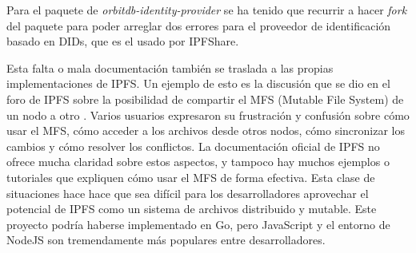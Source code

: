 Para el paquete de \textit{orbitdb-identity-provider} se ha tenido que recurrir a hacer \textit{fork} del paquete para poder arreglar
dos errores para el proveedor de identificación basado en DIDs, que es el usado por IPFShare.

Esta falta o mala documentación también se traslada a las propias implementaciones de IPFS. Un ejemplo de esto es la discusión que se dio en el foro de IPFS sobre la posibilidad de compartir el MFS (Mutable File System) de un nodo a otro \cite{ItPossibleShare}. Varios usuarios expresaron su frustración y confusión sobre cómo usar el MFS, cómo acceder a los archivos desde otros nodos, cómo sincronizar los cambios y cómo resolver los conflictos. La documentación oficial de IPFS no ofrece mucha claridad sobre estos aspectos, y tampoco hay muchos ejemplos o tutoriales que expliquen cómo usar el MFS de forma efectiva. Esta clase de situaciones hace hace que sea difícil para los desarrolladores aprovechar el potencial de IPFS como un sistema de archivos distribuido y mutable. Este proyecto podría haberse implementado en Go, pero JavaScript y el entorno de NodeJS son tremendamente más populares entre desarrolladores.
